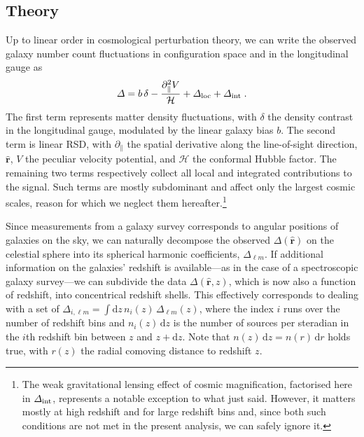 \documentclass[astrosymb,twocolumn]{aastex631}
\newcommand{\de}{\mathrm{d}}
\begin{document}
\subsection{Theory}
Up to linear order in cosmological perturbation theory, we can write the observed galaxy number count fluctuations in configuration space and in the longitudinal gauge as \citep{Yoo:2010ni,Challinor:2011bk,Bonvin:2011bg}
\begin{equation}
    \varDelta=b\,\delta-\frac{\partial_\parallel^2V}{\mathcal H}+\varDelta_{\rm loc}+\varDelta_{\rm int}\;.\label{eq:Delta_g}
\end{equation}
The first term represents matter density fluctuations, with \(\delta\) the density contrast in the longitudinal gauge, modulated by the linear galaxy bias \(b\). The second term is linear RSD, with \(\partial_\parallel\) the spatial derivative along the line-of-sight direction, \(\hat{\bm r}\), \(V\) the peculiar velocity potential, and $\mathcal H$ the conformal Hubble factor. The remaining two terms respectively collect all local and integrated contributions to the signal. Such terms are mostly subdominant and affect only the largest cosmic scales, reason for which we neglect them hereafter.\footnote{The weak gravitational lensing effect of cosmic magnification, factorised here in \(\varDelta_{\rm int}\), represents a notable exception to what just said. However, it matters mostly at high redshift and for large redshift bins and, since both such conditions are not met in the present analysis, we can safely ignore it.}%

Since measurements from a galaxy survey corresponds to angular positions of galaxies on the sky, we can naturally decompose the observed \(\varDelta(\hat{\bm r})\) on the celestial sphere into its spherical harmonic coefficients, \(\varDelta_{\ell m}\). If additional information on the galaxies' redshift is available---as in the case of a spectroscopic galaxy survey---we can subdivide the data \(\varDelta(\hat{\bm r},z)\), which is now also a function of redshift, into concentrical redshift shells. This effectively corresponds to dealing with a set of \(\varDelta_{i,\ell m}=\int\de z\,n_i(z)\,\varDelta_{\ell m}(z)\), where the index \(i\) runs over the number of redshift bins and \(n_i(z)\,\de z\) is the number of sources per steradian in the \(i\)th redshift bin between \(z\) and \(z+\de z\). Note that \(n(z)\,\de z=n( r)\,\de r\) holds true, with \( r(z)\) the radial comoving distance to redshift \(z\).
\end{document}
